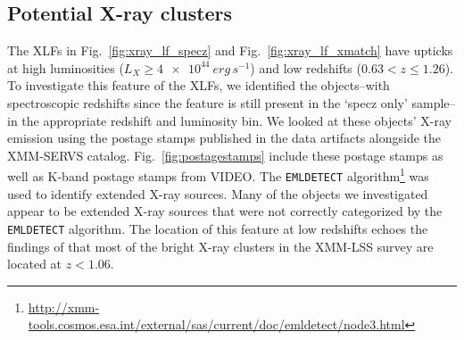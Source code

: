 \documentclass[twocolumn, trackchanges]{aastex63}
\newcommand{\jr}[1]{{\color{purple}[JR: #1]}}
\begin{document}

\subsection{Potential X-ray clusters}
The XLFs in Fig.~\ref{fig:xray_lf_specz} and Fig.~\ref{fig:xray_lf_xmatch} have upticks at high luminosities ($L_X \geq \SI{4e44}{erg\,s^{-1}}$) and low redshifts ($0.63 < z \leq 1.26$).
To investigate this feature  of the XLFs, we identified the  objects--with spectroscopic redshifts since the feature is still present in the `specz only' sample--in the appropriate redshift and luminosity bin.
We looked at these objects' X-ray emission using the postage stamps published in the data artifacts alongside the XMM-SERVS catalog.
Fig.~\ref{fig:postagestamps} include these postage stamps as well as K-band postage stamps from VIDEO.
The \texttt{EMLDETECT} algorithm\footnote{\url{http://xmm-tools.cosmos.esa.int/external/sas/current/doc/emldetect/node3.html}} was used to identify extended X-ray sources.
Many of the objects we investigated appear to be extended X-ray sources that were not correctly categorized by the \texttt{EMLDETECT} algorithm.
The location of this feature at low redshifts echoes the findings of \cite{Clerc2014TheXS} that most of the bright X-ray clusters in the XMM-LSS survey are located at $z < 1.06$.
\end{document}

